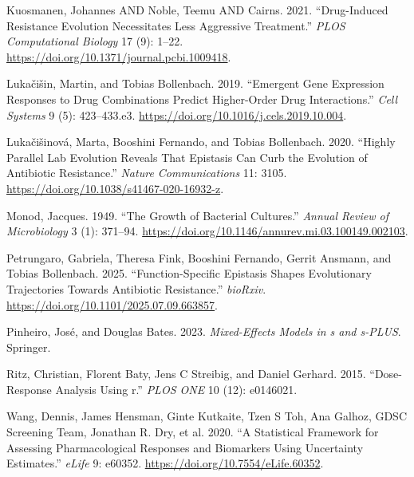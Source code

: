 \documentclass[
]{article}
\newlength{\cslhangindent}
\newenvironment{CSLReferences}[2] %
 {\begin{list}{}{%
  \setlength{\itemindent}{0pt}
  \setlength{\leftmargin}{0pt}
  \setlength{\parsep}{0pt}
  \ifodd #1
   \setlength{\leftmargin}{\cslhangindent}
   \setlength{\itemindent}{-1\cslhangindent}
  \fi
  \setlength{\itemsep}{#2\baselineskip}}}
 {\end{list}}
\begin{document}
\begin{CSLReferences}{1}{0}
Kuosmanen, Johannes AND Noble, Teemu AND Cairns. 2021. {``Drug-Induced
Resistance Evolution Necessitates Less Aggressive Treatment.''}
\emph{PLOS Computational Biology} 17 (9): 1--22.
\url{https://doi.org/10.1371/journal.pcbi.1009418}.

Lukačišin, Martin, and Tobias Bollenbach. 2019. {``Emergent Gene
Expression Responses to Drug Combinations Predict Higher-Order Drug
Interactions.''} \emph{Cell Systems} 9 (5): 423--433.e3.
\url{https://doi.org/10.1016/j.cels.2019.10.004}.

Lukačišinová, Marta, Booshini Fernando, and Tobias Bollenbach. 2020.
{``Highly Parallel Lab Evolution Reveals That Epistasis Can Curb the
Evolution of Antibiotic Resistance.''} \emph{Nature Communications} 11:
3105. \url{https://doi.org/10.1038/s41467-020-16932-z}.

Monod, Jacques. 1949. {``The Growth of Bacterial Cultures.''}
\emph{Annual Review of Microbiology} 3 (1): 371--94.
\url{https://doi.org/10.1146/annurev.mi.03.100149.002103}.

Petrungaro, Gabriela, Theresa Fink, Booshini Fernando, Gerrit Ansmann,
and Tobias Bollenbach. 2025. {``Function-Specific Epistasis Shapes
Evolutionary Trajectories Towards Antibiotic Resistance.''}
\emph{bioRxiv}. \url{https://doi.org/10.1101/2025.07.09.663857}.

Pinheiro, José, and Douglas Bates. 2023. \emph{Mixed-Effects Models in s
and s-PLUS}. Springer.

Ritz, Christian, Florent Baty, Jens C Streibig, and Daniel Gerhard.
2015. {``Dose-Response Analysis Using r.''} \emph{PLOS ONE} 10 (12):
e0146021.

Wang, Dennis, James Hensman, Ginte Kutkaite, Tzen S Toh, Ana Galhoz,
GDSC Screening Team, Jonathan R. Dry, et al. 2020. {``A Statistical
Framework for Assessing Pharmacological Responses and Biomarkers Using
Uncertainty Estimates.''} \emph{eLife} 9: e60352.
\url{https://doi.org/10.7554/eLife.60352}.

\end{CSLReferences}
\end{document}

